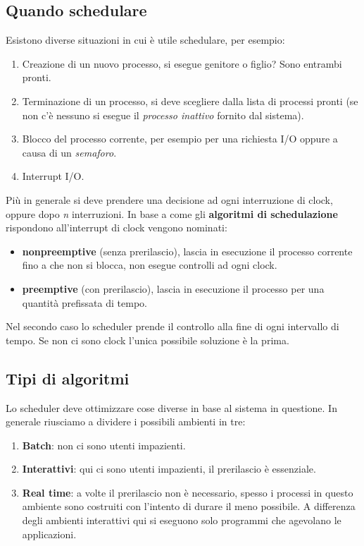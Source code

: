 \subsection{Quando schedulare}

Esistono diverse situazioni in cui è utile schedulare, per esempio:
\begin{enumerate}
    \item Creazione di un nuovo processo, si esegue genitore o figlio? Sono entrambi pronti.
    \item Terminazione di un processo, si deve scegliere dalla lista di processi pronti (se non c'è nessuno si esegue il \textit{processo inattivo} fornito dal sistema).
    \item Blocco del processo corrente, per esempio per una richiesta I/O oppure a causa di un \textit{semaforo}.
    \item Interrupt I/O.
\end{enumerate}

Più in generale si deve prendere una decisione ad ogni interruzione di clock, oppure dopo \textit{n} interruzioni.
In base a come gli \textbf{algoritmi di schedulazione} rispondono all'interrupt di clock vengono nominati:
\begin{itemize}
    \item \textbf{nonpreemptive} (senza prerilascio), lascia in esecuzione il processo corrente fino a che non si blocca, non esegue controlli ad ogni clock.
    \item \textbf{preemptive} (con prerilascio), lascia in esecuzione il processo per una quantità prefissata di tempo. 
\end{itemize}

Nel secondo caso lo scheduler prende il controllo alla fine di ogni intervallo di tempo. Se non ci sono clock l'unica possibile soluzione è la prima.

\subsection{Tipi di algoritmi}
Lo scheduler deve ottimizzare cose diverse in base al sistema in questione. In generale riusciamo a dividere i possibili ambienti in tre:
\begin{enumerate}
    \item \textbf{Batch}: non ci sono utenti impazienti.
    \item \textbf{Interattivi}: qui ci sono utenti impazienti, il prerilascio è essenziale.
    \item \textbf{Real time}: a volte il prerilascio non è necessario, spesso i processi in questo ambiente sono costruiti con l'intento di durare il meno possibile. A differenza degli ambienti interattivi qui si eseguono solo programmi che agevolano le applicazioni.
\end{enumerate}

